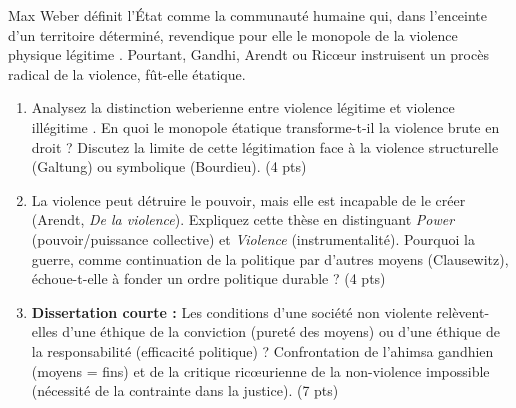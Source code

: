 \documentclass[11pt]{article}
\begin{document}
\begin{exercice}
Max Weber définit l'État comme \og la communauté humaine qui, dans l'enceinte d'un territoire déterminé, revendique pour elle le monopole de la violence physique légitime \fg{}. Pourtant, Gandhi, Arendt ou Ricœur instruisent un procès radical de la violence, fût-elle étatique.

\begin{enumerate}
    \item Analysez la distinction weberienne entre \og violence légitime \fg{} et \og violence illégitime \fg{}. En quoi le \og monopole \fg{} étatique transforme-t-il la violence brute en \og droit \fg{} ? Discutez la limite de cette légitimation face à la \og violence structurelle \fg{} (Galtung) ou symbolique (Bourdieu). (4 pts)
    \item \og La violence peut détruire le pouvoir, mais elle est incapable de le créer \fg{} (Arendt, \textit{De la violence}). Expliquez cette thèse en distinguant \textit{Power} (pouvoir/puissance collective) et \textit{Violence} (instrumentalité). Pourquoi la guerre, comme \og continuation de la politique par d'autres moyens \fg{} (Clausewitz), échoue-t-elle à fonder un ordre politique durable ? (4 pts)
    \item \textbf{Dissertation courte :} \og Les conditions d'une société non violente relèvent-elles d'une éthique de la conviction (pureté des moyens) ou d'une éthique de la responsabilité (efficacité politique) ? \fg{} Confrontation de l'ahimsa gandhien (moyens = fins) et de la critique ricœurienne de la \og non-violence impossible \fg{} (nécessité de la contrainte dans la justice). (7 pts)
\end{enumerate}
\end{exercice}
\end{document}
